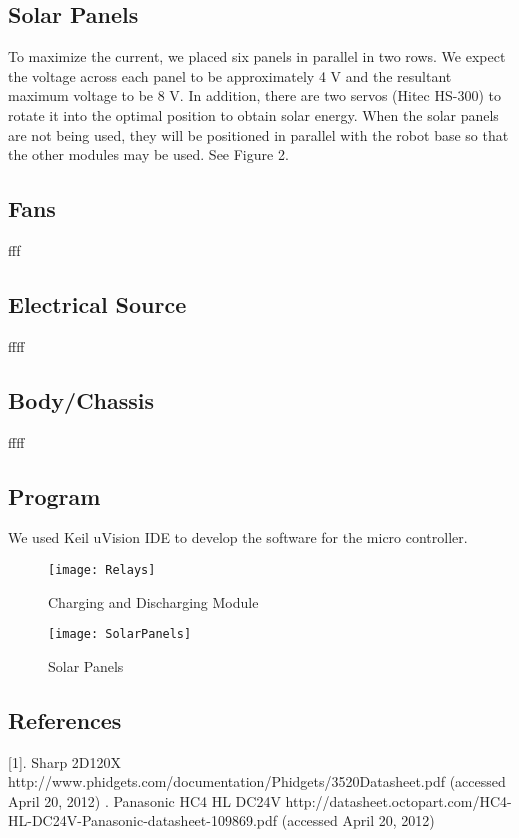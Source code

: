 \documentclass[12pt]{article}
\begin{document}
\subsection{Solar Panels}
To maximize the current, we placed six panels in parallel in two rows. We expect the voltage across each panel to be approximately 4 V and the resultant maximum voltage to be 8 V. In addition, there are two servos (Hitec HS-300) to rotate it into the optimal position to obtain solar energy. When the solar panels are not being used, they will be positioned in parallel with the robot base so that the other modules may be used. See Figure 2. 


\subsection{Fans}fff

\subsection{Electrical Source}ffff

\subsection{Body/Chassis}ffff

\subsection{Program}
We used Keil uVision IDE to develop the software for the micro controller. 




{
\begin{figure}[htbp]
  \centering
  \texttt{[image: Relays]}
  \caption{Charging and Discharging Module}
  \label{fig:CapacitorsRelays}
\end{figure}
  }
  
  {
\begin{figure}[htbp] %
  \centering
  \texttt{[image: SolarPanels]} 
  \caption{Solar Panels}
   \label{fig:SolarPanels}
\end{figure}
}

\subsection{References}
[1]. Sharp 2D120X http://www.phidgets.com/documentation/Phidgets/3520Datasheet.pdf (accessed April 20, 2012)
\newline
[2]. Panasonic HC4 HL DC24V http://datasheet.octopart.com/HC4-HL-DC24V-Panasonic-datasheet-109869.pdf (accessed April 20, 2012)
\end{document}
